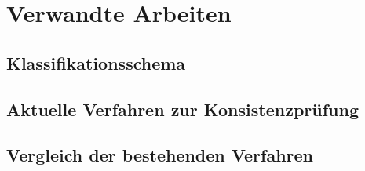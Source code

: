 \chapter{Verwandte Arbeiten}

\section{Klassifikationsschema}

\section{Aktuelle Verfahren zur Konsistenzprüfung}

\section{Vergleich der bestehenden Verfahren}
